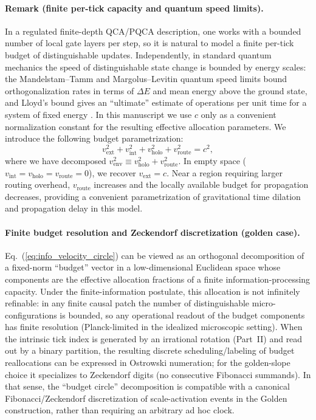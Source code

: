 \paragraph{Remark (finite per-tick capacity and quantum speed limits).}
In a regulated finite-depth QCA/PQCA description, one works with a bounded number of local gate layers per step, so it is natural to model a finite per-tick budget of distinguishable updates. Independently, in standard quantum mechanics the speed of distinguishable state change is bounded by energy scales: the Mandelstam--Tamm and Margolus--Levitin quantum speed limits bound orthogonalization rates in terms of $\Delta E$ and mean energy above the ground state, and Lloyd's bound gives an ``ultimate'' estimate of operations per unit time for a system of fixed energy \cite{MandelstamTamm1945,MargolusLevitin1998,lloyd2000ultimate}. In this manuscript we use $c$ only as a convenient normalization constant for the resulting effective allocation parameters.
We introduce the following budget parametrization:
\begin{equation}
    v_{\text{ext}}^2 + v_{\text{int}}^2 + v_{\text{holo}}^2 + v_{\text{route}}^2 = c^2,
\label{eq:info_velocity_circle}
\end{equation}
where we have decomposed $v_{\text{env}}^2 \equiv v_{\text{holo}}^2 + v_{\text{route}}^2$. In empty space ($v_{\text{int}} = v_{\text{holo}} = v_{\text{route}} = 0$), we recover $v_{\text{ext}} = c$. Near a region requiring larger routing overhead, $v_{\text{route}}$ increases and the locally available budget for propagation decreases, providing a convenient parametrization of gravitational time dilation and propagation delay in this model.

\paragraph{Finite budget resolution and Zeckendorf discretization (golden case).}
Eq.~(\ref{eq:info_velocity_circle}) can be viewed as an orthogonal decomposition of a fixed-norm ``budget'' vector in a low-dimensional Euclidean space whose components are the effective allocation fractions of a finite information-processing capacity.
Under the finite-information postulate, this allocation is not infinitely refinable: in any finite causal patch the number of distinguishable micro-configurations is bounded, so any operational readout of the budget components has finite resolution (Planck-limited in the idealized microscopic setting).
When the intrinsic tick index is generated by an irrational rotation (Part~II) and read out by a binary partition, the resulting discrete scheduling/labeling of budget reallocations can be expressed in Ostrowski numeration; for the golden-slope choice it specializes to Zeckendorf digits (no consecutive Fibonacci summands). In that sense, the ``budget circle'' decomposition is compatible with a canonical Fibonacci/Zeckendorf discretization of scale-activation events in the Golden construction, rather than requiring an arbitrary ad hoc clock.

